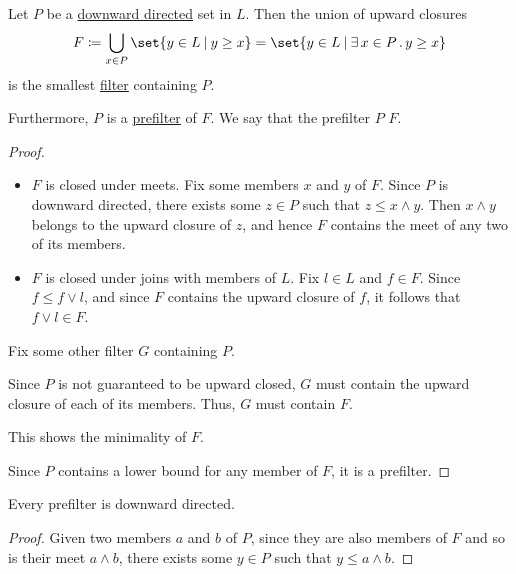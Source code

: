 \begin{proposition}\label{thm:filter_from_prefilter}
  Let \( P \) be a \hyperref[def:directed_set]{downward directed} set in \( L \). Then the union of upward closures
  \begin{equation*}
    F \coloneqq \bigcup_{x \in P} \set{ y \in L \given y \geq x } = \set{ y \in L \given \qexists{x \in P} y \geq x }
  \end{equation*}
  is the smallest \hyperref[def:lattice_ideal/ideal]{filter} containing \( P \).

  Furthermore, \( P \) is a \hyperref[def:prefilter]{prefilter} of \( F \). We say that the prefilter \( P \)  \( F \).
\end{proposition}
\begin{proof}

  \begin{itemize}
    \item \( F \) is closed under meets. Fix some members \( x \) and \( y \) of \( F \). Since \( P \) is downward directed, there exists some \( z \in P \) such that \( z \leq x \wedge y \). Then \( x \wedge y \) belongs to the upward closure of \( z \), and hence \( F \) contains the meet of any two of its members.

    \item \( F \) is closed under joins with members of \( L \). Fix \( l \in L \) and \( f \in F \). Since \( f \leq f \vee l \), and since \( F \) contains the upward closure of \( f \), it follows that \( f \vee l \in F \).
  \end{itemize}

   Fix some other filter \( G \) containing \( P \).

  Since \( P \) is not guaranteed to be upward closed, \( G \) must contain the upward closure of each of its members. Thus, \( G \) must contain \( F \).

  This shows the minimality of \( F \).

   Since \( P \) contains a lower bound for any member of \( F \), it is a prefilter.
\end{proof}

\begin{proposition}\label{thm:prefilter_can_generate_filter}
  Every prefilter is downward directed.
\end{proposition}
\begin{proof}
  Given two members \( a \) and \( b \) of \( P \), since they are also members of \( F \) and so is their meet \( a \wedge b \), there exists some \( y \in P \) such that \( y \leq a \wedge b \).
\end{proof}

